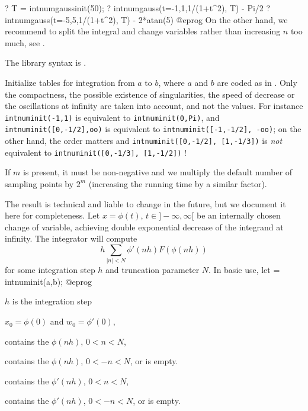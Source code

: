 ? T = intnumgaussinit(50);
? intnumgauss(t=-1,1,1/(1+t^2), T) - Pi/2
? intnumgauss(t=-5,5,1/(1+t^2), T) - 2*atan(5)
@eprog
On the other hand, we recommend to split the integral and change variables
rather than increasing $n$ too much, see .

The library syntax is .

\label{se:intnuminit}
Initialize tables for integration from
$a$ to $b$, where $a$ and $b$ are coded as in . Only the
compactness, the possible existence of singularities, the speed of decrease
or the oscillations at infinity are taken into account, and not the values.
For instance {\tt intnuminit(-1,1)} is equivalent to {\tt intnuminit(0,Pi)},
and {\tt intnuminit([0,-1/2],oo)} is equivalent to
{\tt intnuminit([-1,-1/2], -oo)}; on the other hand, the order matters
and
{\tt intnuminit([0,-1/2], [1,-1/3])} is \emph{not} equivalent to
{\tt intnuminit([0,-1/3], [1,-1/2])} !

If $m$ is present, it must be non-negative and we multiply the default
number of sampling points by $2^m$ (increasing the running time by a
similar factor).

The result is technical and liable to change in the future, but we document
it here for completeness. Let $x=\phi(t)$, $t\in ]-\infty,\infty[$ be an
internally chosen change of variable, achieving double exponential decrease of
the integrand at infinity. The integrator  will compute
$$ h \sum_{|n| < N} \phi'(nh) F(\phi(nh)) $$
for some integration step $h$ and truncation parameter $N$.
In basic use, let
\bprog
[h, x0, w0, xp, wp, xm, wm] = intnuminit(a,b);
@eprog

\item $h$ is the integration step

\item $x_0 = \phi(0)$  and $w_0 = \phi'(0)$,

\item {} contains the $\phi(nh)$, $0 < n < N$,

\item {} contains the $\phi(nh)$, $0 < -n < N$, or is empty.

\item {} contains the $\phi'(nh)$, $0 < n < N$,

\item {} contains the $\phi'(nh)$, $0 < -n < N$, or is empty.

